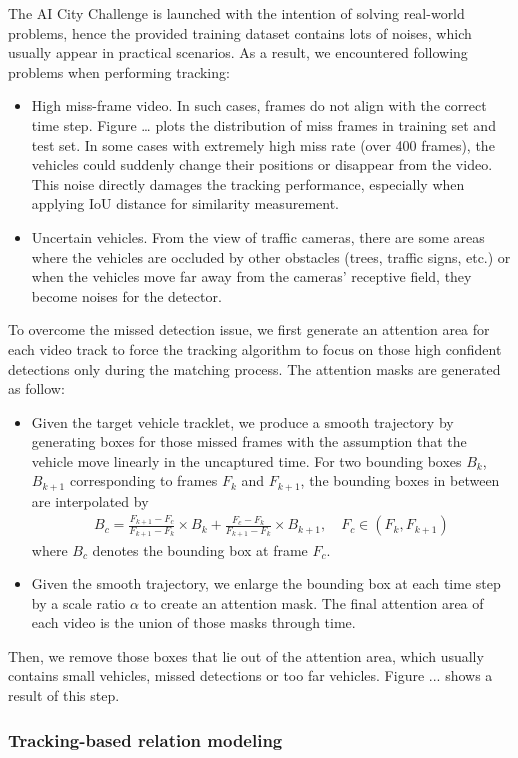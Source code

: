 The AI City Challenge is launched with the intention of solving real-world problems, hence the provided training dataset contains lots of noises, which usually appear in practical scenarios. As a result, we encountered following problems when performing tracking:
\begin{itemize}
    \item High miss-frame video. In such cases, frames do not align with the correct time step. Figure … plots the distribution of miss frames in training set and test set. In some cases with extremely high miss rate (over 400 frames), the vehicles could suddenly change their positions or disappear from the video. This noise directly damages the tracking performance, especially when applying IoU distance for similarity measurement.
    \item Uncertain vehicles. From the view of traffic cameras, there are some areas where the vehicles are occluded by other obstacles (trees, traffic signs, etc.) or when the vehicles move far away from the cameras’ receptive field, they become noises for the detector.
\end{itemize}
To overcome the missed detection issue, we first generate an attention area for each video track to force the tracking algorithm to focus on those high confident detections only during the matching process. 
The attention masks are generated as follow:
\begin{itemize}
    \item Given the target vehicle tracklet, we produce a smooth trajectory by generating boxes for those missed frames with the assumption that the vehicle move linearly in the uncaptured time. For two bounding boxes $B_k$, $B_{k+1}$ corresponding to frames $F_k$ and $F_{k+1}$, the bounding boxes in between are interpolated by
    \begin{align}
        B_c = \frac{F_{k+1} - F_c}{F_{k+1} - F_k} \times B_k + \frac{F_{c} - F_k}{F_{k+1} - F_k} \times B_{k + 1}, \quad F_c \in (F_k, F_{k+1})
    \end{align}
    where $B_c$ denotes the bounding box at frame $F_c$. 
    \item Given the smooth trajectory, we enlarge the bounding box at each time step by a scale ratio $\alpha$ to create an attention mask. The final attention area of each video is the union of those masks through time.
\end{itemize}
Then, we remove those boxes that lie out of the attention area, which usually contains small vehicles, missed detections or too far vehicles. Figure ... shows a result of this step.

\subsubsection{Tracking-based relation modeling}

